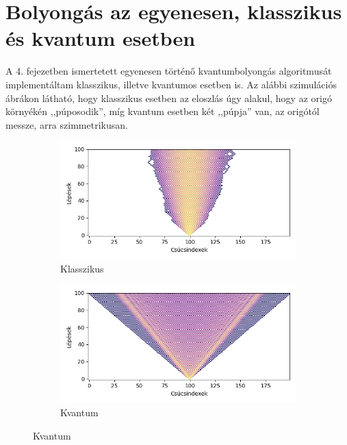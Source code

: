\section{Bolyongás az egyenesen, klasszikus és kvantum esetben}

A 4. fejezetben ismertetett egyenesen történő kvantumbolyongás algoritmusát
implementáltam klasszikus, illetve kvantumos esetben is. Az alábbi szimulációs
ábrákon látható, hogy klasszikus esetben az eloszlás úgy alakul, hogy az origó
környékén ,,púposodik'', míg kvantum esetben két ,,púpja'' van, az origótól
messze, arra szimmetrikusan.

\begin{figure}[H]
  \centering
  \begin{subfigure}{.45\linewidth}
    \centering
    \includegraphics[width=\linewidth]{./figures/quantum/classical_simulation_short.jpg}
    \caption{Klasszikus}
  \end{subfigure}
  \begin{subfigure}{.45\linewidth}
    \centering
    \includegraphics[width=\linewidth]{./figures/quantum/quantum_simulation_short.jpg}
    \caption{Kvantum}
  \end{subfigure}
\end{figure}

